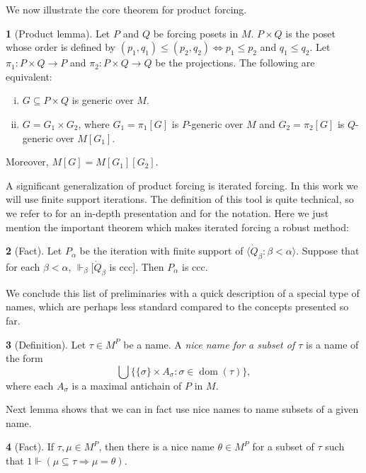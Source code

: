 \documentclass[11pt,a4paper]{report}
\theoremstyle{definition}
\theoremstyle{num.custom-title}
\theoremstyle{custom-title}
\newtheorem*{teo_custom-title_nonum}{}
\DeclareMathOperator{\dom}{dom}
\DeclareMathOperator{\imp}{\Rightarrow}
\DeclareMathOperator{\sse}{\subseteq}
\renewcommand{\iff}{\Leftrightarrow}
\newcommand{\forces}{\Vdash}
\begin{document}
We now illustrate the core theorem for product forcing.

\begin{teo_custom-title_nonum}[Product lemma] \label{lemma-product_lemma}
Let $P$ and $Q$ be forcing posets in $M$. $P \times Q$ is the poset whose order is defined by $(p_1,q_1) \leq (p_2,q_2) \iff p_1 \leq p_2$ and $q_1 \leq q_2$. Let $\pi_1 \colon P \times Q \to P$ and $\pi_2 \colon P \times Q \to Q$ be the projections. The following are equivalent:
\begin{enumerate}[(i)]
\item $G \sse P \times Q$ is generic over $M$.
\item $G = G_1 \times G_2$, where $G_1 = \pi_1[G]$ is $P$-generic over $M$ and $G_2 = \pi_2[G]$ is $Q$-generic over $M[G_1]$.
\end{enumerate}
Moreover, $M[G] = M[G_1][G_2]$.
\end{teo_custom-title_nonum}

A significant generalization of product forcing is iterated forcing. In this work we will use finite support iterations. The definition of this tool is quite technical, so we refer to \cite{Kun2013} for an in-depth presentation and for the notation. Here we just mention the important theorem which makes iterated forcing a robust method:

\begin{teo_custom-title_nonum}[Fact]
Let $P_\alpha$ be the iteration with finite support of $\langle \dot{Q}_\beta : \beta < \alpha \rangle$. Suppose that for each $\beta < \alpha$, $\forces_\beta [\dot{Q}_\beta$ is ccc$]$. Then $P_\alpha$ is ccc.
\end{teo_custom-title_nonum}

We conclude this list of preliminaries with a quick description of a special type of names, which are perhaps less standard compared to the concepts presented so far.

\begin{teo_custom-title_nonum}[Definition]
Let $\tau \in M^P$ be a name. A \emph{nice name for a subset of $\tau$} is a name of the form
\[
\bigcup \big\{ \{\sigma\} \times A_\sigma : \sigma \in \dom(\tau) \big\},
\]
where each $A_\sigma$ is a maximal antichain of $P$ in $M$.
\end{teo_custom-title_nonum}

Next lemma shows that we can in fact use nice names to name subsets of a given name.

\begin{teo_custom-title_nonum}[Fact]\label{lemma-nice_names_exist}
If $\tau, \mu \in M^P$, then there is a nice name $\theta \in M^P$ for a subset of $\tau$ such that $1 \forces (\mu \sse \tau \imp \mu = \theta)$.
\end{teo_custom-title_nonum}
\end{document}
